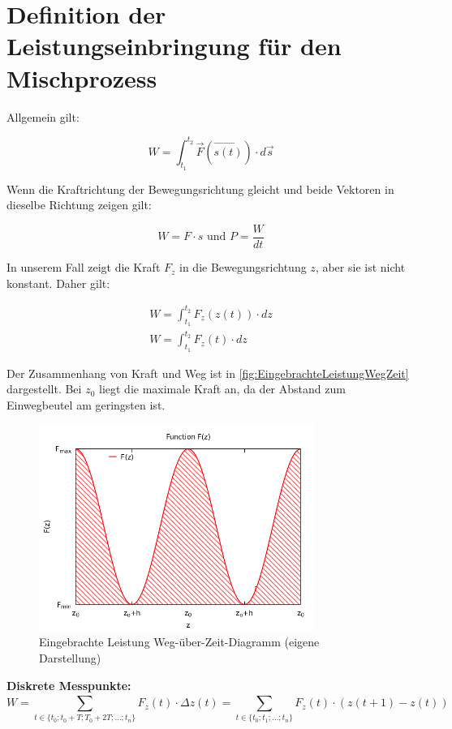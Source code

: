 \section{Definition der Leistungseinbringung für den Mischprozess}

Allgemein gilt:

\begin{equation}
    W = \int_{t_1}^{t_2} \vec{F}(\vec{s(t)})\cdot d \vec{s}
\end{equation}

\noindent Wenn die Kraftrichtung der Bewegungsrichtung gleicht und beide Vektoren in dieselbe Richtung zeigen gilt:

\begin{equation}
    W = F \cdot s \text{   und   } P = \frac{W}{dt}
\end{equation}

\noindent In unserem Fall zeigt die Kraft \(F_z\) in die Bewegungsrichtung \(z\), aber sie ist nicht konstant. Daher gilt:

\begin{equation}
    \begin{aligned}
        W = \int_{t_1}^{t_2} F_z (z(t))\cdot dz\\
        W = \int_{t_1}^{t_2} F_z (t)\cdot dz
    \end{aligned}
\end{equation}

Der Zusammenhang von Kraft und Weg ist in \autoref{fig:EingebrachteLeistungWegZeit} dargestellt. Bei \(z_0\) liegt die maximale Kraft an, da der Abstand zum Einwegbeutel am geringsten ist.

\begin{figure}[h]
    \centering
    \includegraphics[width=0.8\textwidth]{bilder/force-over-distance.png}
    \caption[Eingebrachte Leistung Weg-über-Zeit-Diagramm]{Eingebrachte Leistung Weg-über-Zeit-Diagramm (eigene Darstellung)}\label{fig:EingebrachteLeistungWegZeit}
\end{figure}
\FloatBarrier

\textbf{Diskrete Messpunkte:}
\begin{equation}
    W = \sum_{t \in \{t_0; t_0 + T; T_0 + 2T; \dots; t_n\}}^{} F_z(t) \cdot \Delta z(t) = \sum_{t \in \{t_0; t_1; \dots; t_n\}}^{} F_z (t) \cdot (z(t+1)-z(t))
\end{equation}